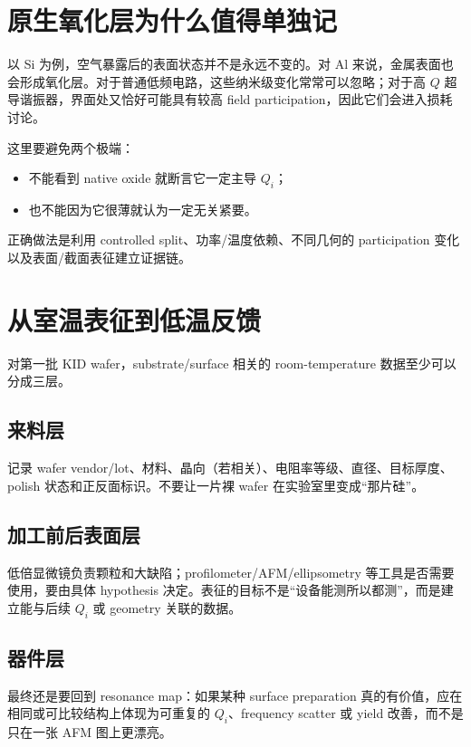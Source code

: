 \section{原生氧化层为什么值得单独记}

以 Si 为例，空气暴露后的表面状态并不是永远不变的。对 Al 来说，金属表面也会形成氧化层。对于普通低频电路，这些纳米级变化常常可以忽略；对于高 $Q$ 超导谐振器，界面处又恰好可能具有较高 field participation，因此它们会进入损耗讨论。

这里要避免两个极端：

\begin{itemize}
  \item 不能看到 native oxide 就断言它一定主导 $Q_i$；
  \item 也不能因为它很薄就认为一定无关紧要。
\end{itemize}

正确做法是利用 controlled split、功率/温度依赖、不同几何的 participation 变化以及表面/截面表征建立证据链。

\section{从室温表征到低温反馈}

对第一批 KID wafer，substrate/surface 相关的 room-temperature 数据至少可以分成三层。

\subsection{来料层}

记录 wafer vendor/lot、材料、晶向（若相关）、电阻率等级、直径、目标厚度、polish 状态和正反面标识。不要让一片裸 wafer 在实验室里变成“那片硅”。

\subsection{加工前后表面层}

低倍显微镜负责颗粒和大缺陷；profilometer/AFM/ellipsometry 等工具是否需要使用，要由具体 hypothesis 决定。表征的目标不是“设备能测所以都测”，而是建立能与后续 $Q_i$ 或 geometry 关联的数据。

\subsection{器件层}

最终还是要回到 resonance map：如果某种 surface preparation 真的有价值，应在相同或可比较结构上体现为可重复的 $Q_i$、frequency scatter 或 yield 改善，而不是只在一张 AFM 图上更漂亮。

